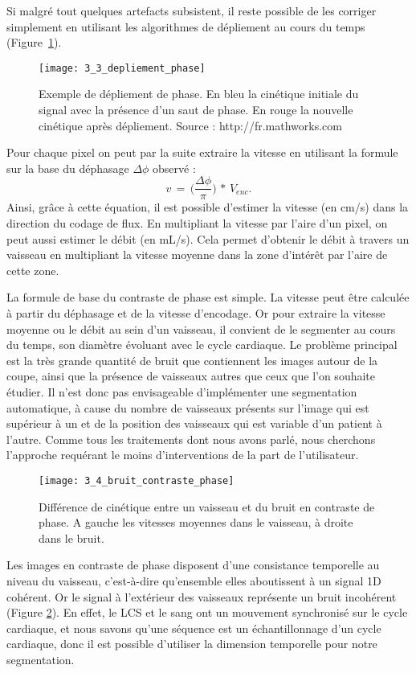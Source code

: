 Si malgré tout quelques artefacts subsistent, il reste possible de les corriger simplement en
utilisant les algorithmes de dépliement au cours du temps (Figure~\ref{fig:3_3_depliement_phase}).
\begin{figure}[!t]
\centering
\texttt{[image: 3\_3\_depliement\_phase]}
\caption{Exemple de dépliement de phase. En bleu la cinétique initiale du signal avec la présence d'un saut de
phase. En rouge la nouvelle cinétique après dépliement. Source : http://fr.mathworks.com}
\label{fig:3_3_depliement_phase}	
\end{figure}
Pour chaque pixel on peut par la suite extraire la vitesse en utilisant la formule sur la base du
déphasage $\Delta \phi$ observé :
\begin{equation}
v\,=\,\biggl(\frac{\Delta\phi}{\pi}\biggr)\,*\,V_{enc}.
\end{equation}
Ainsi, grâce à cette équation, il est possible d’estimer la vitesse (en cm/s) dans la direction du codage
de flux. En multipliant la vitesse par l’aire d’un pixel, on peut aussi estimer le débit (en mL/s). Cela
permet d’obtenir le débit à travers un vaisseau en multipliant la vitesse moyenne dans la zone d’intérêt
par l’aire de cette zone.

La formule de base du contraste de phase est simple. La vitesse peut être calculée à partir du
déphasage et de la vitesse d’encodage. Or pour extraire la vitesse moyenne ou le débit au sein d’un
vaisseau, il convient de le segmenter au cours du temps, son diamètre évoluant avec le cycle cardiaque.
Le problème principal est la très grande quantité de bruit que contiennent les images autour de la
coupe, ainsi que la présence de vaisseaux autres que ceux que l’on souhaite étudier. Il n’est donc pas
envisageable d’implémenter une segmentation automatique, à cause du nombre de vaisseaux présents
sur l’image qui est supérieur à un et de la position des vaisseaux qui est variable d’un patient à l’autre.
Comme tous les traitements dont nous avons parlé, nous cherchons l’approche requérant le moins
d’interventions de la part de l’utilisateur.

\begin{figure}[!t]
\centering
\texttt{[image: 3\_4\_bruit\_contraste\_phase]}
\caption{Différence de cinétique entre un vaisseau et du bruit en contraste de phase. A gauche les vitesses moyennes dans
le vaisseau, à droite dans le bruit.}
\label{fig:3_4_bruit_contraste_phase}	
\end{figure}
Les images en contraste de phase disposent d’une consistance temporelle au niveau du vaisseau,
c’est-à-dire qu’ensemble elles aboutissent à un signal 1D cohérent. Or le signal à l’extérieur des
vaisseaux représente un bruit incohérent (Figure \ref{fig:3_4_bruit_contraste_phase}). En effet, le LCS et le sang ont un mouvement
synchronisé sur le cycle cardiaque, et nous savons qu’une séquence est un échantillonnage d’un cycle
cardiaque, donc il est possible d’utiliser la dimension temporelle pour notre segmentation.

